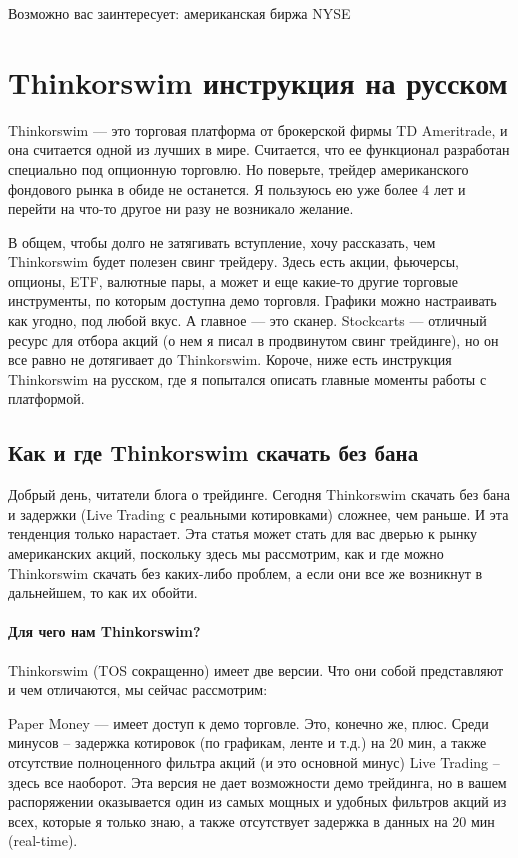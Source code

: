 \documentclass[a5paper]{article}
\begin{document}
Возможно вас заинтересует: американская биржа NYSE


\section{Thinkorswim инструкция на русском}

Thinkorswim — это торговая платформа от брокерской фирмы TD Ameritrade, и она считается одной из лучших в мире. Считается, что ее функционал разработан специально под опционную торговлю. Но поверьте, трейдер американского фондового рынка в обиде не останется. Я пользуюсь ею уже более 4 лет и перейти на что-то другое ни разу не возникало желание.

В общем, чтобы долго не затягивать вступление, хочу рассказать, чем
Thinkorswim будет полезен свинг трейдеру. Здесь есть акции, фьючерсы,
опционы, ETF, валютные пары, а может и еще какие-то другие торговые
инструменты, по которым доступна демо торговля. Графики можно
настраивать как угодно, под любой вкус. А главное — это
сканер. Stockcarts — отличный ресурс для отбора акций (о нем я писал в
продвинутом свинг трейдинге), но он все равно не дотягивает до
Thinkorswim. Короче, ниже есть инструкция Thinkorswim на русском, где
я попытался описать главные моменты работы с платформой.

\subsection{Как и где Thinkorswim скачать без бана}

Добрый день, читатели блога о трейдинге. Сегодня Thinkorswim скачать без бана и задержки (Live Trading с реальными котировками) сложнее, чем раньше. И эта тенденция только нарастает. Эта статья может стать для вас дверью к рынку американских акций, поскольку здесь мы рассмотрим, как и где можно Thinkorswim скачать без каких-либо проблем, а если они все же возникнут в дальнейшем, то как их обойти.

\paragraph{Для чего нам Thinkorswim?}

Thinkorswim (TOS сокращенно) имеет две версии. Что они собой представляют и чем отличаются, мы сейчас рассмотрим:

    Paper Money — имеет доступ к демо торговле. Это, конечно же, плюс. Среди минусов – задержка котировок (по графикам, ленте и т.д.) на 20 мин, а также отсутствие полноценного фильтра акций (и это основной минус)
    Live Trading – здесь все наоборот. Эта версия не дает возможности демо трейдинга, но в вашем распоряжении оказывается один из самых мощных и удобных фильтров акций из всех, которые я только знаю, а также отсутствует задержка в данных на 20 мин (real-time).
\end{document}
